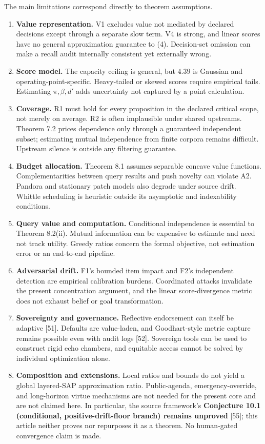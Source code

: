 \documentclass[
  11pt]{article}
\providecommand{\tightlist}{%
  \setlength{\itemsep}{0pt}\setlength{\parskip}{0pt}}
\begin{document}
The main limitations correspond directly to theorem assumptions.

\begin{enumerate}
\def\labelenumi{\arabic{enumi}.}
\tightlist
\item
  \textbf{Value representation.} V1 excludes value not mediated by declared decisions except through a separate slow term. V4 is strong, and linear scores have no general approximation guarantee to (4). Decision-set omission can make a recall audit internally consistent yet externally wrong.
\item
  \textbf{Score model.} The capacity ceiling is general, but \(4.39\) is Gaussian and operating-point-specific. Heavy-tailed or skewed scores require empirical tails. Estimating \(\pi,\beta,d'\) adds uncertainty not captured by a point calculation.
\item
  \textbf{Coverage.} R1 must hold for every proposition in the declared critical scope, not merely on average. R2 is often implausible under shared upstreams. Theorem 7.2 prices dependence only through a guaranteed independent subset; estimating mutual independence from finite corpora remains difficult. Upstream silence is outside any filtering guarantee.
\item
  \textbf{Budget allocation.} Theorem 8.1 assumes separable concave value functions. Complementarities between query results and push novelty can violate A2. Pandora and stationary patch models also degrade under source drift. Whittle scheduling is heuristic outside its asymptotic and indexability conditions.
\item
  \textbf{Query value and computation.} Conditional independence is essential to Theorem 8.2(ii). Mutual information can be expensive to estimate and need not track utility. Greedy ratios concern the formal objective, not estimation error or an end-to-end pipeline.
\item
  \textbf{Adversarial drift.} F1's bounded item impact and F2's independent detection are empirical calibration burdens. Coordinated attacks invalidate the present concentration argument, and the linear score-divergence metric does not exhaust belief or goal transformation.
\item
  \textbf{Sovereignty and governance.} Reflective endorsement can itself be adaptive {[}51{]}. Defaults are value-laden, and Goodhart-style metric capture remains possible even with audit logs {[}52{]}. Sovereign tools can be used to construct rigid echo chambers, and equitable access cannot be solved by individual optimization alone.
\item
  \textbf{Composition and extensions.} Local ratios and bounds do not yield a global layered-SAP approximation ratio. Public-agenda, emergency-override, and long-horizon virtue mechanisms are not needed for the present core and are not claimed here. In particular, the source framework's \textbf{Conjecture 10.1 (conditional, positive-drift-floor branch) remains unproved} {[}55{]}; this article neither proves nor repurposes it as a theorem. No human-gated convergence claim is made.
\end{enumerate}
\end{document}
